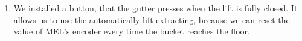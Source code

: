 \begin{enumerate}
\begin{enumerate}
		\item We installed a button, that the gutter presses when the lift is fully closed. It allows us to use the automatically lift extracting, because we can reset the value of MEL's encoder every time the bucket reaches the floor.
		\begin{figure}[H]
			\begin{minipage}[h]{0.31\linewidth}
			\end{minipage}
			\hfill
			\begin{minipage}[h]{0.31\linewidth}
			\end{minipage}
			\hfill
			\begin{minipage}[h]{0.31\linewidth}

\end{minipage}
\end{figure}
\end{enumerate}
\end{enumerate}

